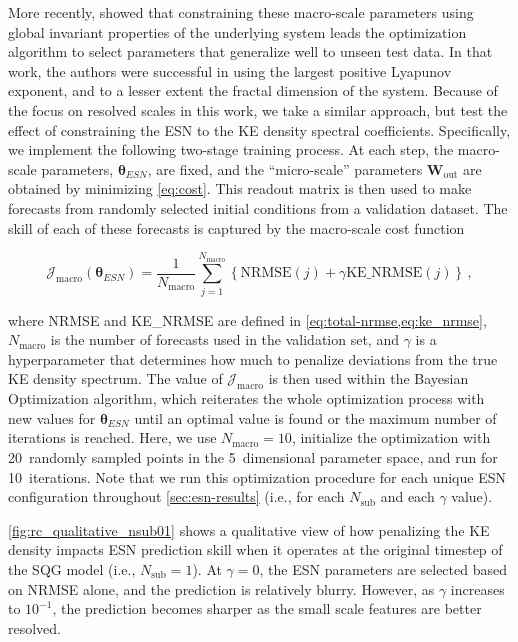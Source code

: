\documentclass[draft]{agujournal2019}
\newcommand{\hyperparameters}{\bm{\theta}}
\newcommand{\esnparams}{\hyperparameters_{ESN}}
\newcommand{\Wout}{\mathbf{W}_\text{out}}
\newcommand{\cf}{\mathcal{J}}
\newcommand{\macrocost}{\cf_\text{macro}}
\newcommand{\nsub}{N_\text{sub}}
\newcommand{\nmacro}{N_\text{macro}}
\newcommand{\citet}{\citeA}
\begin{document}
More recently, \citet{platt_constraining_2023}
showed that constraining these macro-scale
parameters using global invariant properties of the underlying system leads the
optimization algorithm to select parameters that generalize well to unseen test data. In that work, the authors were successful in using the largest positive
Lyapunov exponent, and to a lesser extent the fractal dimension of the system.
Because of the focus on resolved scales in this work, we take a similar approach, but test the effect of constraining the ESN to the KE density spectral coefficients.
Specifically, we implement the following two-stage training process.
At each step, the macro-scale parameters, $\esnparams$, are fixed, and the
``micro-scale'' parameters $\Wout$ are obtained by minimizing \cref{eq:cost}.
This readout matrix is then used to make forecasts from randomly selected
initial conditions from a validation dataset.
The skill of each of these forecasts is captured by the macro-scale cost
function
\begin{linenomath*}\begin{equation}
    \cf_\text{macro}(\esnparams) = \dfrac{1}{\nmacro}
    \sum_{j=1}^{\nmacro}
    \left\{
        \text{NRMSE}(j) + \gamma \text{KE\_NRMSE}(j)
    \right\}
    \label{eq:macro-cost} \, ,
\end{equation}\end{linenomath*}
where NRMSE and KE\_NRMSE are defined in \cref{eq:total-nrmse,eq:ke_nrmse},
$\nmacro$ is the number of forecasts used in the validation set, and $\gamma$ is
a hyperparameter that determines how much to penalize deviations
from the true KE density spectrum.
The value of $\macrocost$ is then used within the Bayesian Optimization algorithm, which reiterates the whole optimization process with new values for
$\esnparams$ until an optimal value is found or the maximum number of iterations is reached.
Here, we use $\nmacro=10$, initialize the optimization with 20~randomly sampled points in the 5~dimensional parameter space, and run for 10~iterations. Note that we run this optimization procedure for each unique ESN configuration
throughout \cref{sec:esn-results} (i.e., for each $\nsub$ and each $\gamma$
value).

\cref{fig:rc_qualitative_nsub01} shows a qualitative view of how penalizing the
KE density impacts ESN prediction skill when it operates at the original
timestep of the SQG model (i.e., $\nsub=1$).
At $\gamma=0$, the ESN parameters are selected based on NRMSE alone, and
the prediction is relatively blurry.
However, as $\gamma$ increases to $10^{-1}$, the prediction becomes sharper as
the small scale features are better resolved.
\end{document}
